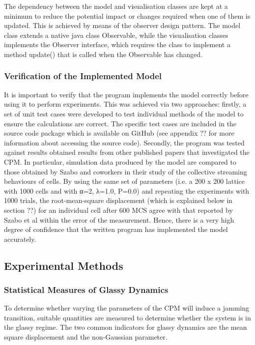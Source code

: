 \documentclass[a4paper,12pt]{article}
\begin{document}
The dependency between the model and visualisation classes are kept at a minimum to reduce the potential impact or changes required when one of them is updated. This is achieved by means of the observer design pattern. The model class extends a native java class Observable, while the visualisation classes implements the Observer interface, which requires the class to implement a method update() that is called when the Observable has changed. 

\subsubsection{Verification of the Implemented Model}
It is important to verify that the program implements the model correctly before using it to perform experiments. This was achieved via two approaches: firstly, a set of unit test cases were developed to test individual methods of the model to ensure the calculations are correct. The specific test cases are included in the source code package which is available on GitHub (see appendix ?? for more information about accessing the source code). Secondly, the program was tested against results obtained results from other published papers that investigated the CPM. In particular, simulation data produced by the model are compared to those obtained by Szabo and coworkers in their study of the collective streaming behaviours of cells. By using the same set of parameters (i.e. a 200 x 200 lattice with 1000 cells and with α=2, λ=1.0, P=0.0) and repeating the experiments with 1000 trials, the root-mean-square displacement (which is explained below in section ??) for an individual cell after 600 MCS agree with that reported by Szabo et al within the error of the measurement. Hence, there is a very high degree of confidence that the written program has implemented the model accurately.


\subsection{Experimental Methods}
\subsubsection{Statistical Measures of Glassy Dynamics}
To determine whether varying the parameters of the CPM will induce a jamming transition, suitable quantities are measured to determine whether the system is in the glassy regime. The two common indicators for glassy dynamics are the mean square displacement and the non-Gaussian parameter.
\end{document}
